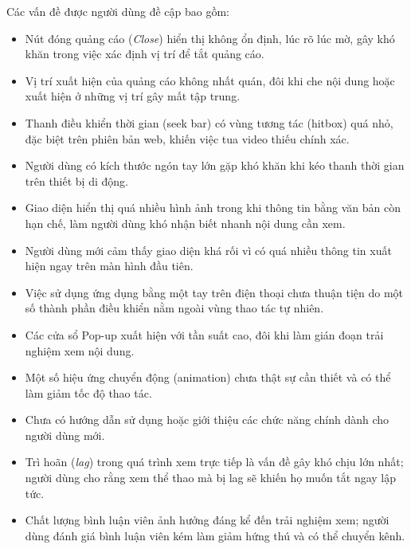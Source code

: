 \documentclass[a4paper,12pt]{article}
\begin{document}
Các vấn đề được người dùng đề cập bao gồm:

\begin{itemize}
    \item Nút đóng quảng cáo (\textit{Close}) hiển thị không ổn định, lúc rõ lúc mờ, gây khó khăn trong việc xác định vị trí để tắt quảng cáo.
    
    \item Vị trí xuất hiện của quảng cáo không nhất quán, đôi khi che nội dung hoặc xuất hiện ở những vị trí gây mất tập trung.
    
    \item Thanh điều khiển thời gian (seek bar) có vùng tương tác (hitbox) quá nhỏ, đặc biệt trên phiên bản web, khiến việc tua video thiếu chính xác.
    
    \item Người dùng có kích thước ngón tay lớn gặp khó khăn khi kéo thanh thời gian trên thiết bị di động.
    
    \item Giao diện hiển thị quá nhiều hình ảnh trong khi thông tin bằng văn bản còn hạn chế, làm người dùng khó nhận biết nhanh nội dung cần xem.
    
    \item Người dùng mới cảm thấy giao diện khá rối vì có quá nhiều thông tin xuất hiện ngay trên màn hình đầu tiên.
    
    \item Việc sử dụng ứng dụng bằng một tay trên điện thoại chưa thuận tiện do một số thành phần điều khiển nằm ngoài vùng thao tác tự nhiên.
    
    \item Các cửa sổ Pop-up xuất hiện với tần suất cao, đôi khi làm gián đoạn trải nghiệm xem nội dung.
    
    \item Một số hiệu ứng chuyển động (animation) chưa thật sự cần thiết và có thể làm giảm tốc độ thao tác.
    
    \item Chưa có hướng dẫn sử dụng hoặc giới thiệu các chức năng chính dành cho người dùng mới.
    
    \item Trì hoãn (\textit{lag}) trong quá trình xem trực tiếp là vấn đề gây khó chịu lớn nhất; người dùng cho rằng xem thể thao mà bị lag sẽ khiến họ muốn tắt ngay lập tức.
    
    \item Chất lượng bình luận viên ảnh hưởng đáng kể đến trải nghiệm xem; người dùng đánh giá bình luận viên kém làm giảm hứng thú và có thể chuyển kênh.
    

\end{itemize}
\end{document}

